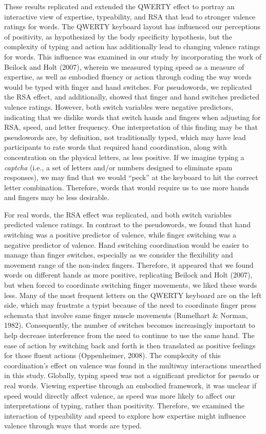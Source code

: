 \documentclass[english,man, mask]{apa6}
\theoremstyle{definition}
\theoremstyle{definition}
\theoremstyle{definition}
\theoremstyle{remark}
\begin{document}
These results replicated and extended the QWERTY effect to portray an
interactive view of expertise, typeability, and RSA that lead to
stronger valence ratings for words. The QWERTY keyboard layout has
influenced our perceptions of positivity, as hypothesized by the body
specificity hypothesis, but the complexity of typing and action has
additionally lead to changing valence ratings for words. This influence
was examined in our study by incorporating the work of Beilock and Holt
(2007), wherein we measured typing speed as a measure of expertise, as
well as embodied fluency or action through coding the way words would be
typed with finger and hand switches. For pseudowords, we replicated the
RSA effect, and additionally, showed that finger and hand switches
predicted valence ratings. However, both switch variables were negative
predictors, indicating that we dislike words that switch hands and
fingers when adjusting for RSA, speed, and letter frequency. One
interpretation of this finding may be that pseudowords are, by
definition, not traditionally typed, which may have lead participants to
rate words that required hand coordination, along with concentration on
the physical letters, as less positive. If we imagine typing a
\emph{captcha} (i.e., a set of letters and/or numbers designed to
eliminate spam responses), we may find that we would \enquote{peck} at
the keyboard to hit the correct letter combination. Therefore, words
that would require us to use more hands and fingers may be less
desirable.

For real words, the RSA effect was replicated, and both switch variables
predicted valence ratings. In contrast to the pseudowords, we found that
hand switching was a positive predictor of valence, while finger
switching was a negative predictor of valence. Hand switching
coordination would be easier to manage than finger switches, especially
as we consider the flexibility and movement range of the non-index
fingers. Therefore, it appeared that we found words on different hands
as more positive, replicating Beilock and Holt (2007), but when forced
to coordinate switching finger movements, we liked these words less.
Many of the most frequent letters on the QWERTY keyboard are on the left
side, which may frustrate a typist because of the need to coordinate
finger press schemata that involve same finger muscle movements
(Rumelhart \& Norman, 1982). Consequently, the number of switches
becomes increasingly important to help decrease interference from the
need to continue to use the same hand. The ease of action by switching
back and forth is then translated as positive feelings for those fluent
actions (Oppenheimer, 2008). The complexity of this coordination's
effect on valence was found in the multiway interactions unearthed in
this study. Globally, typing speed was not a significant predictor for
pseudo or real words. Viewing expertise through an embodied framework,
it was unclear if speed would directly affect valence, as speed was more
likely to affect our interpretations of typing, rather than positivity.
Therefore, we examined the interaction of typeability and speed to
explore how expertise might influence valence through ways that words
are typed.
\end{document}
